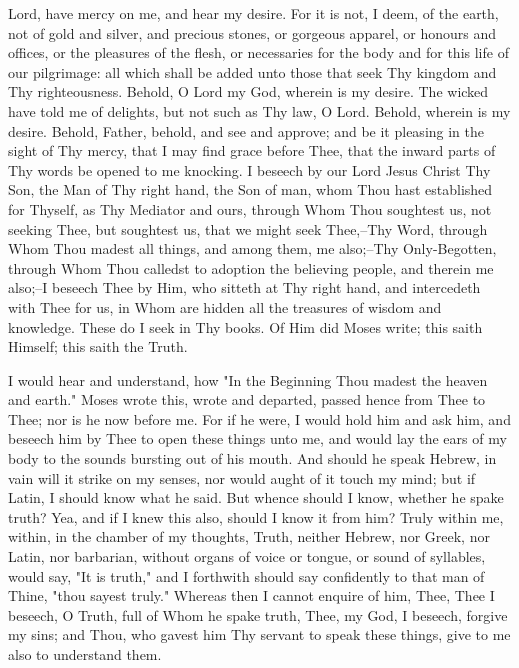 \documentclass[b5paper,openright,12pt,twoside]{book}
\begin{document}
Lord, have mercy on me, and hear my desire. For it is not, I deem, of
the earth, not of gold and silver, and precious stones, or gorgeous
apparel, or honours and offices, or the pleasures of the flesh, or
necessaries for the body and for this life of our pilgrimage: all which
shall be added unto those that seek Thy kingdom and Thy righteousness.
Behold, O Lord my God, wherein is my desire. The wicked have told me of
delights, but not such as Thy law, O Lord. Behold, wherein is my desire.
Behold, Father, behold, and see and approve; and be it pleasing in the
sight of Thy mercy, that I may find grace before Thee, that the inward
parts of Thy words be opened to me knocking. I beseech by our Lord Jesus
Christ Thy Son, the Man of Thy right hand, the Son of man, whom Thou
hast established for Thyself, as Thy Mediator and ours, through Whom
Thou soughtest us, not seeking Thee, but soughtest us, that we might
seek Thee,--Thy Word, through Whom Thou madest all things, and among
them, me also;--Thy Only-Begotten, through Whom Thou calledst to
adoption the believing people, and therein me also;--I beseech Thee by
Him, who sitteth at Thy right hand, and intercedeth with Thee for us,
in Whom are hidden all the treasures of wisdom and knowledge. These do
I seek in Thy books. Of Him did Moses write; this saith Himself; this
saith the Truth.

I would hear and understand, how "In the Beginning Thou madest the
heaven and earth." Moses wrote this, wrote and departed, passed hence
from Thee to Thee; nor is he now before me. For if he were, I would hold
him and ask him, and beseech him by Thee to open these things unto me,
and would lay the ears of my body to the sounds bursting out of his
mouth. And should he speak Hebrew, in vain will it strike on my senses,
nor would aught of it touch my mind; but if Latin, I should know what
he said. But whence should I know, whether he spake truth? Yea, and if
I knew this also, should I know it from him? Truly within me, within, in
the chamber of my thoughts, Truth, neither Hebrew, nor Greek, nor Latin,
nor barbarian, without organs of voice or tongue, or sound of syllables,
would say, "It is truth," and I forthwith should say confidently to that
man of Thine, "thou sayest truly." Whereas then I cannot enquire of him,
Thee, Thee I beseech, O Truth, full of Whom he spake truth, Thee, my
God, I beseech, forgive my sins; and Thou, who gavest him Thy servant to
speak these things, give to me also to understand them.
\end{document}
